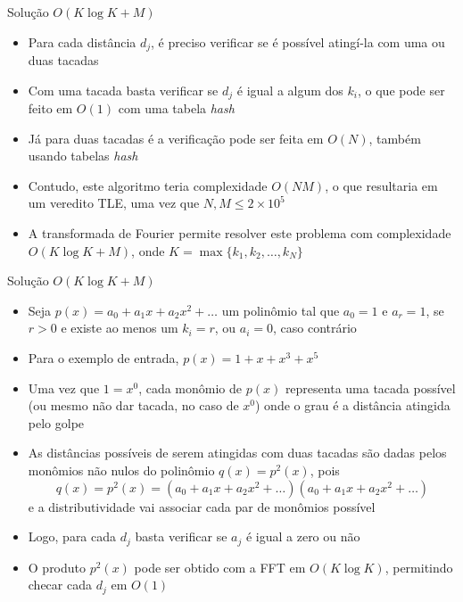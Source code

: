 \begin{frame}[fragile]{Solução $O(K\log K + M)$}

    \begin{itemize}
        \item Para cada distância $d_j$, é preciso verificar se é possível atingí-la com uma
            ou duas tacadas

        \item Com uma tacada basta verificar se $d_j$ é igual a algum dos $k_i$, o que pode ser
            feito em $O(1)$ com uma tabela \textit{hash}
        
        \item Já para duas tacadas é a verificação pode ser feita em $O(N)$, também usando tabelas
            \textit{hash}

        \item Contudo, este algoritmo teria complexidade $O(NM)$, o que resultaria em um veredito
            TLE, uma vez que $N, M\leq 2\times 10^5$
            
        \item A transformada de Fourier permite resolver este problema com complexidade 
            $O(K\log K + M)$, onde $K = \max\{k_1, k_2, \ldots, k_N\}$
   \end{itemize}

\end{frame}

\begin{frame}[fragile]{Solução $O(K\log K + M)$}

    \begin{itemize}
        \item Seja $p(x) = a_0 + a_1x + a_2x^2 + \ldots$ um polinômio tal que $a_0 = 1$ e
            $a_r = 1$, se $r > 0$ e existe ao menos um $k_i = r$, ou $a_i = 0$, caso contrário

        \item Para o exemplo de entrada, $p(x) = 1 + x + x^3 + x^5$

        \item Uma vez que $1 = x^0$, cada monômio de $p(x)$ representa uma tacada possível (ou 
            mesmo não dar tacada, no caso de $x^0$) onde o grau é a distância atingida pelo golpe

        \item As distâncias possíveis de serem atingidas com duas tacadas são dadas pelos monômios
            não nulos do polinômio $q(x) = p^2(x)$, pois
        \[
            q(x) = p^2(x) = (a_0 + a_1x + a_2x^2 + \ldots)(a_0 + a_1x + a_2x^2 + \ldots) 
        \]
        e a distributividade vai associar cada par de monômios possível

        \item Logo, para cada $d_j$ basta verificar se $a_j$ é igual a zero ou não

        \item O produto $p^2(x)$ pode ser obtido com a FFT em $O(K\log K)$, permitindo checar
            cada $d_j$ em $O(1)$
            
    \end{itemize}

\end{frame}

